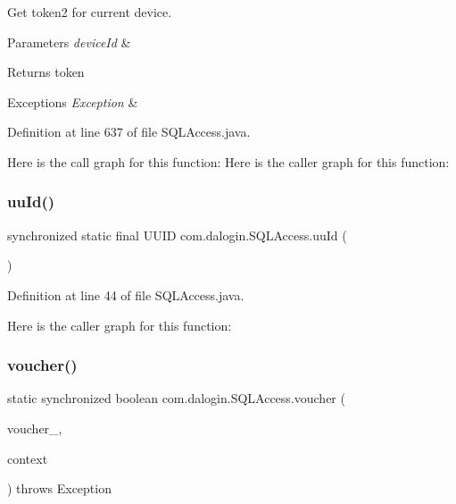 Get token2 for current device.


\begin{DoxyParams}{Parameters}
{\em device\+Id} & \\
\hline
\end{DoxyParams}
\begin{DoxyReturn}{Returns}
token 
\end{DoxyReturn}

\begin{DoxyExceptions}{Exceptions}
{\em Exception} & \\
\hline
\end{DoxyExceptions}


Definition at line 637 of file S\+Q\+L\+Access.\+java.

Here is the call graph for this function\+:
Here is the caller graph for this function\+:
\mbox{\label{classcom_1_1dalogin_1_1_s_q_l_access_aacb151b38bdb068523f10a75a2069149}} 
\subsubsection{\texorpdfstring{uu\+Id()}{uuId()}}
{\footnotesize\ttfamily synchronized static final U\+U\+ID com.\+dalogin.\+S\+Q\+L\+Access.\+uu\+Id (\begin{DoxyParamCaption}{ }\end{DoxyParamCaption})\hspace{0.3cm}{\ttfamily [static]}}



Definition at line 44 of file S\+Q\+L\+Access.\+java.

Here is the caller graph for this function\+:
\mbox{\label{classcom_1_1dalogin_1_1_s_q_l_access_ace6682e8e095aa1d589a181c3ec37cb0}} 
\subsubsection{\texorpdfstring{voucher()}{voucher()}}
{\footnotesize\ttfamily static synchronized boolean com.\+dalogin.\+S\+Q\+L\+Access.\+voucher (\begin{DoxyParamCaption}\item[{String}]{voucher\+\_\+,  }\item[{Servlet\+Context}]{context }\end{DoxyParamCaption}) throws Exception\hspace{0.3cm}{\ttfamily [static]}}


